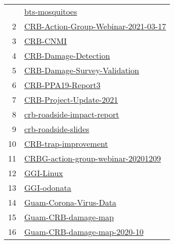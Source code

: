 \begin{longtable}{rl}
\bottomrule
\endlastfoot
 1 &                                             \href{https://github.com/aubreymoore/bts-mosquitoes}{bts-mosquitoes} \\
 2 &   \href{https://github.com/aubreymoore/CRB-Action-Group-Webinar-2021-03-17}{CRB-Action-Group-Webinar-2021-03-17} \\
 3 &                                                         \href{https://github.com/aubreymoore/CRB-CNMI}{CRB-CNMI} \\
 4 &                                 \href{https://github.com/aubreymoore/CRB-Damage-Detection}{CRB-Damage-Detection} \\
 5 &                 \href{https://github.com/aubreymoore/CRB-Damage-Survey-Validation}{CRB-Damage-Survey-Validation} \\
 6 &                                       \href{https://github.com/aubreymoore/CRB-PPA19-Report3}{CRB-PPA19-Report3} \\
 7 &                           \href{https://github.com/aubreymoore/CRB-Project-Update-2021}{CRB-Project-Update-2021} \\
 8 &                     \href{https://github.com/aubreymoore/crb-roadside-impact-report}{crb-roadside-impact-report} \\
 9 &                                   \href{https://github.com/aubreymoore/crb-roadside-slides}{crb-roadside-slides} \\
10 &                                 \href{https://github.com/aubreymoore/CRB-trap-improvement}{CRB-trap-improvement} \\
11 &     \href{https://github.com/aubreymoore/CRBG-action-group-webinar-20201209}{CRBG-action-group-webinar-20201209} \\
12 &                                                       \href{https://github.com/aubreymoore/GGI-Linux}{GGI-Linux} \\
13 &                                                   \href{https://github.com/aubreymoore/GGI-odonata}{GGI-odonata} \\
14 &                             \href{https://github.com/aubreymoore/Guam-Corona-Virus-Data}{Guam-Corona-Virus-Data} \\
15 &                                   \href{https://github.com/aubreymoore/Guam-CRB-damage-map}{Guam-CRB-damage-map} \\
16 &                   \href{https://github.com/aubreymoore/Guam-CRB-damage-map-2020-10}{Guam-CRB-damage-map-2020-10} \\

\end{longtable}
